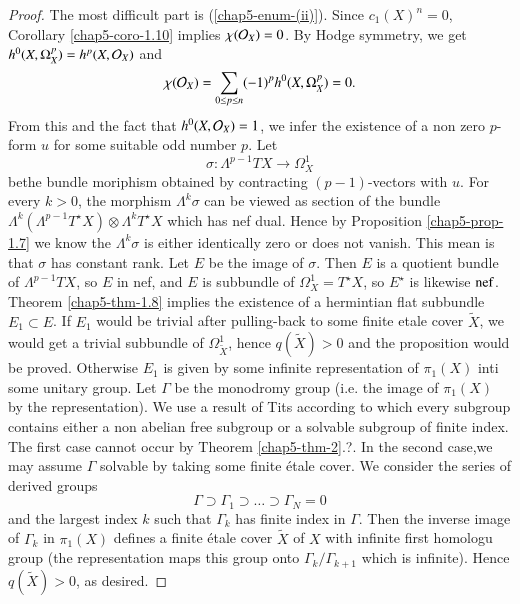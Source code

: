 \begin{proof}
The most difficult part is (\ref{chap5-enum-(ii)}). Since $c_{1}(X)^{n} =0$, Corollary \ref{chap5-coro-1.10} implies $_{}\chi(\mathcal{O}_{X}) = 0$. By Hodge symmetry, we get $h^{0}(X, \Omega_{X}^{p}) = h^{p}(X, \mathcal{O}_{X})$ and
$$
_{}\chi(\mathcal{O}_{X}) = \sum\limits_{0 \leq p \leq n} (-1)^{p}h^{0}(X, \Omega_{X}^{p}) = 0.
$$
From this and the fact that $h^{0}(X, \mathcal{O}_{X}) =1$, we infer the existence of a non zero $p$-form $u$ for some suitable odd number $p$. Let
$$
\sigma : \Lambda^{p-1}TX \rightarrow \Omega_{X}^{1} 
$$
be\pageoriginale the bundle moriphism obtained by contracting $(p-1)$-vectors with $u$. For every $k > 0$, the morphism $\Lambda^{k}\sigma$
can be viewed as section of the bundle $\Lambda^{k}(\Lambda^{p-1}T^{\star}X)\otimes \Lambda^{k}T^{\star}X$ which has nef dual. Hence by Proposition \ref{chap5-prop-1.7} we know the $\Lambda^{k}\sigma$ is either identically zero or does not vanish. This mean is that $\sigma$ has constant rank. Let $E$ be the image of $\sigma$. Then $E$ is a quotient bundle of $\Lambda^{p-1}TX$, so $E$ in nef, and $E$ is subbundle of $\Omega_{X}^{1} = T^{\star}X$, so $E^{\star}$ is likewise $\operatorname{nef}$.
Theorem \ref{chap5-thm-1.8} implies the existence of a hermintian flat subbundle $E_{1} \subset E$. If $E_{1}$ would be trivial after pulling-back to some finite  etale cover $\widetilde{X}$, we would get a trivial subbundle of $\Omega_{\widetilde{X}}^{1}$, hence $q(\widetilde{X}) > 0$ and the proposition would be proved. Otherwise $E_{1}$ is given by some infinite representation of $\pi_{1}(X)$ inti some unitary group. Let $\Gamma$ be the monodromy group (i.e. the image of $\pi_{1}(X)$ by the representation). We use a result of Tits \cite{chap5-keyTi72} according to which every subgroup contains either a non abelian free subgroup or a solvable subgroup of finite index. The first case cannot occur by Theorem \ref{chap5-thm-2}.?. In the second case,we may assume $\Gamma$ solvable by taking some finite \'etale cover. We consider the series of derived groups
$$
\Gamma \supset \Gamma_{1} \supset \ldots \supset \Gamma_{N} = {0}
$$
and the largest index $k$ such that $\Gamma_{k}$ has finite index in $\Gamma$. Then the inverse image of $\Gamma_{k}$ in $\pi_{1}(X)$ defines a finite \'etale cover $\widetilde{X}$ of $X$  with infinite first homologu group (the representation maps this group onto $\Gamma_{k}/\Gamma_{k+1}$ which is infinite). Hence $q(\widetilde{X}) > 0$, as desired.
\end{proof}

